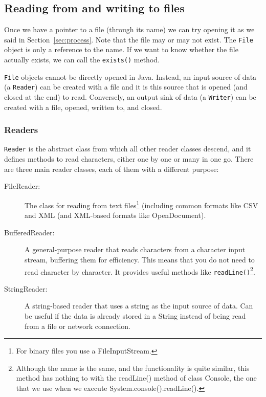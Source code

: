 \subsection{Reading from and writing to files}
\label{sec:reading-from-writing}

Once we have a pointer to a file (through its name) we can try opening
it as we said in Section~\ref{sec:process}. Note that the file may or
may not exist. The \verb+File+ object is only a reference to the
name. If we want to know whether the file actually exists, we can call the
\verb+exists()+ method. 

\verb+File+ objects cannot be directly opened in Java. Instead, an
input source of data (a \verb+Reader+) can be created with a file and
it is this source that is opened (and closed at the end) to
read. Conversely, an output sink of data (a \verb+Writer+) can be
created with a file, opened, written to, and closed. 


\subsubsection{Readers}
\label{sec:reader}

\verb+Reader+ is the abstract class from which all other reader
classes descend, and it defines methods to read characters, either one
by one or many in one go. 
There are three main reader classes, each of them with
a different purpose: 

\begin{description}
\item[FileReader: ] The class for reading from text files\footnote{For
  binary files you use a FileInputStream.} (including
  common formats like CSV and XML (and XML-based formats like
  OpenDocument). 
\item[BufferedReader: ] A general-purpose reader that reads characters
  from a character input stream, buffering them for efficiency. This
  means that you do not need to read character by character. It
  provides useful methods like \verb+readLine()+\footnote{Although the
  name is the same, and the functionality is quite similar, this
  method has nothing to with the readLine() method of class Console,
  the one that we use when we execute System.console().readLine().}.
\item[StringReader: ] A string-based reader that uses a string as the
  input source of data. Can be useful if the data is already stored in
  a String instead of being read from a file or network connection. 
\end{description}

